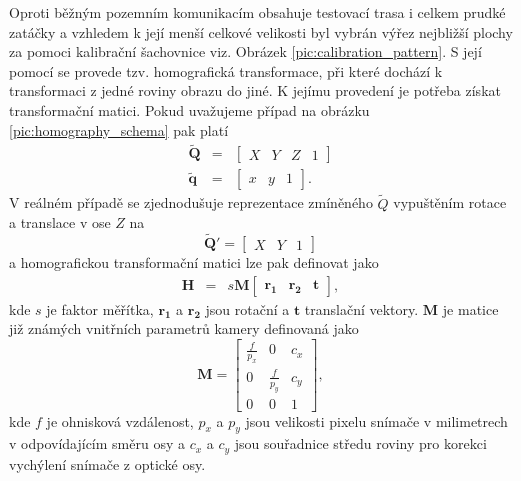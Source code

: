 \documentclass[czech, bc, kky, he, iso690numb]{fasthesis}
\begin{document}
            	Oproti běžným pozemním komunikacím obsahuje testovací trasa i celkem prudké zatáčky a vzhledem k její menší celkové velikosti byl vybrán výřez nejbližší plochy za pomoci kalibrační šachovnice viz. Obrázek \ref{pic:calibration_pattern}. S její pomocí se provede tzv. homografická transformace, při které dochází k transformaci z jedné roviny obrazu do jiné. K jejímu provedení je potřeba získat transformační matici. Pokud uvažujeme případ na obrázku \ref{pic:homography_schema} pak platí
	            	\begin{eqnarray}
	            		\widetilde{\mathbf{Q}} &=& \begin{bmatrix}X&Y&Z&1\end{bmatrix}\\
	            		\widetilde{\mathbf{q}} &=& \begin{bmatrix}x&y&1\end{bmatrix}.
	            	\end{eqnarray}
	            V reálném případě se zjednodušuje reprezentace zmíněného \(\widetilde{Q}\) vypuštěním rotace a translace v ose \(Z\) na 
	            	\begin{equation}
	            		\widetilde{\mathbf{Q}}' = \begin{bmatrix}X&Y&1\end{bmatrix}
	            	\end{equation}
	            a homografickou transformační matici lze pak definovat jako 
	            	\begin{eqnarray}
	            		\mathbf{\mathbf{H}} &=& s\mathbf{M}\begin{bmatrix}\mathbf{r_{1}}& \mathbf{r_{2}} & \mathbf{t}\end{bmatrix},
	            	\end{eqnarray}
	            kde \(s\) je faktor měřítka, \(\mathbf{r_{1}}\) a \(\mathbf{r_{2}}\) jsou rotační a \(\mathbf{t}\) translační vektory. \(\mathbf{M}\) je matice již známých vnitřních parametrů kamery definovaná jako
	            	\begin{equation}
	            		\mathbf{M} = 
	            		\begin{bmatrix}
	            			\frac{f}{p_{x}}&0&c_{x}\\
	            			0&\frac{f}{p_{y}}&c_{y}\\
	            			0&0&1
	            		\end{bmatrix},
	            	\end{equation}
	            kde \(f\) je ohnisková vzdálenost, \(p_{x}\) a \(p_{y}\) jsou velikosti pixelu snímače v milimetrech v odpovídajícím směru osy a \(c_{x}\) a \(c_{y}\) jsou souřadnice středu roviny pro korekci vychýlení snímače z optické osy.
	            
\end{document}

